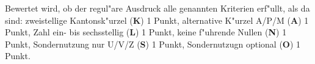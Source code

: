 \begin{bewertung}
Bewertet wird, ob der regul"are Ausdruck alle genannten Kriterien 
erf"ullt, als da sind:
zweistellige Kantonsk"urzel ({\bf K}) 1 Punkt,
alternative K"urzel A/P/M ({\bf A}) 1 Punkt,
Zahl ein- bis sechsstellig ({\bf L}) 1 Punkt,
keine f"uhrende Nullen ({\bf N}) 1 Punkt,
Sondernutzung nur U/V/Z ({\bf S}) 1 Punkt,
Sondernutzugn optional ({\bf O}) 1 Punkt.
\end{bewertung}

